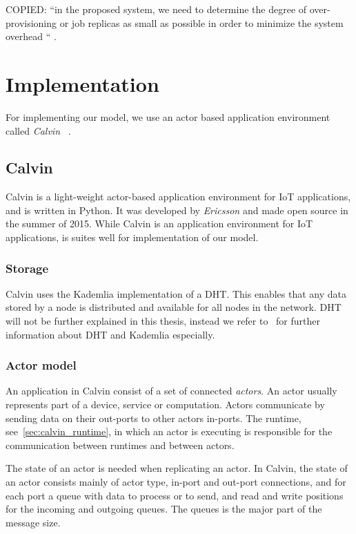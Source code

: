 \documentclass{cslthse-msc}
\begin{document}
COPIED: “in the proposed system, we need to determine the degree of over-provisioning or job replicas as small as possible in order to minimize the system overhead “ \cite{designFaultTolerantSched}.
\fi

\section{Implementation} \label{sec:design_implementation}
For implementing our model, we use an actor based application environment called \emph{Calvin} ~\cite{calvin}.

\subsection{Calvin} \label{subsec:design_calvin}
Calvin is a light-weight actor-based application environment for IoT applications, and is written in Python. It was developed by \emph{Ericsson} and made open source in the summer of 2015. While Calvin is an application environment for IoT applications, is suites well for implementation of our model.

\subsubsection{Storage} \label{sec:calvin_storage}
Calvin uses the Kademlia implementation of a DHT. This enables that any data stored by a node is distributed and available for all nodes in the network. DHT will not be further explained in this thesis, instead we refer to~\cite{TODO Kademlia} for further information about DHT and Kademlia especially.

\subsubsection{Actor model}
An application in Calvin consist of a set of connected \emph{actors}. An actor usually represents part of a device, service or computation. Actors communicate by sending data on their out-ports to other actors in-ports. The runtime, see~\cref{sec:calvin_runtime}, in which an actor is executing is responsible for the communication between runtimes and between actors.

The state of an actor is needed when replicating an actor. In Calvin, the state of an actor consists mainly of actor type, in-port and out-port connections, and for each port a queue with data to process or to send, and read and write positions for the incoming and outgoing queues. The queues is the major part of the message size.
\end{document}
